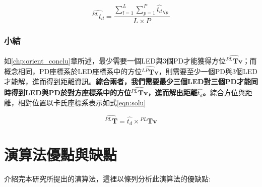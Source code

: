         \begin{equation}
            \label{eqn:average_dis}
            \hat{^{PL}t_d }= \frac{\sum^{L}_{l=1}\sum^{P}_{p=1} \hat{t_d },_{lp} }{L\times P}
        \end{equation}

        \subsubsection{小結}

        如\ref{chp:orient_conclu}章所述，最少需要一個LED與3個PD才能獲得方位$\hat{{^{PL}\boldsymbol{Tv}}}$；而概念相同，PD座標系於LED座標系中的方位$\hat{{^{LP}\boldsymbol{Tv}}}$，則需要至少一個PD與3個LED才能解，進而得到距離資訊。\textbf{綜合兩者，我們需要最少三個LED對三個PD才能同時得到LED與PD於對方座標系中的方位$\hat{{^{PL}\boldsymbol{Tv}}}$，進而解出距離$\hat{t_d}$。}綜合方位與距離，相對位置以卡氏座標系表示如式\ref{eqn:solu}


        \begin{equation}
            \label{eqn:solu}
            \hat{^{PL}\boldsymbol{T} }= \hat{t_d} \times {^{PL}\boldsymbol{Tv}} 
        \end{equation}

\section{演算法優點與缺點}
\label{chp:algorithm_ad_dis}


介紹完本研究所提出的演算法，這裡以條列分析此演算法的優缺點:


